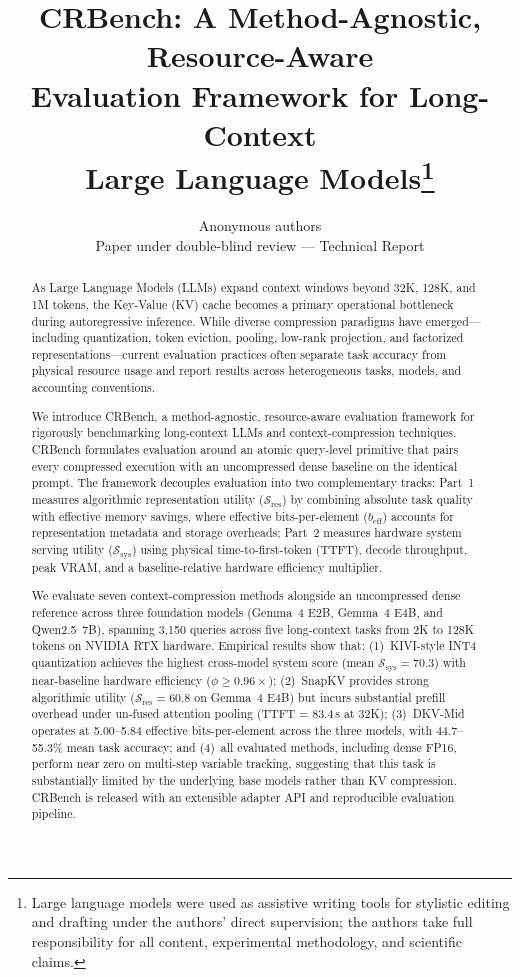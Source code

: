 \documentclass[10pt]{article}
\title{CRBench: A Method-Agnostic, Resource-Aware \\ Evaluation Framework for Long-Context \\ Large Language Models\thanks{Large language models were used as assistive writing tools for stylistic editing and drafting under the authors' direct supervision; the authors take full responsibility for all content, experimental methodology, and scientific claims.}}
\author{\name Anonymous authors \\
        \addr Paper under double-blind review --- Technical Report}
\theoremstyle{definition}
\begin{document}
\maketitle

\begin{abstract}
As Large Language Models (LLMs) expand context windows beyond 32K, 128K, and 1M tokens, the Key-Value (KV) cache becomes a primary operational bottleneck during autoregressive inference. While diverse compression paradigms have emerged---including quantization, token eviction, pooling, low-rank projection, and factorized representations---current evaluation practices often separate task accuracy from physical resource usage and report results across heterogeneous tasks, models, and accounting conventions.

We introduce CRBench, a method-agnostic, resource-aware evaluation framework for rigorously benchmarking long-context LLMs and context-compression techniques. CRBench formulates evaluation around an atomic query-level primitive that pairs every compressed execution with an uncompressed dense baseline on the identical prompt. The framework decouples evaluation into two complementary tracks: Part~1 measures algorithmic representation utility ($\mathcal{S}_{\text{res}}$) by combining absolute task quality with effective memory savings, where effective bits-per-element ($b_{\text{eff}}$) accounts for representation metadata and storage overheads; Part~2 measures hardware system serving utility ($\mathcal{S}_{\text{sys}}$) using physical time-to-first-token (TTFT), decode throughput, peak VRAM, and a baseline-relative hardware efficiency multiplier.

We evaluate seven context-compression methods alongside an uncompressed dense reference across three foundation models (Gemma~4 E2B, Gemma~4 E4B, and Qwen2.5~7B), spanning 3,150 queries across five long-context tasks from 2K to 128K tokens on NVIDIA RTX hardware. Empirical results show that: (1)~KIVI-style INT4 quantization achieves the highest cross-model system score (mean $\mathcal{S}_{\text{sys}} = 70.3$) with near-baseline hardware efficiency ($\phi \ge 0.96\times$); (2)~SnapKV provides strong algorithmic utility ($\mathcal{S}_{\text{res}} = 60.8$ on Gemma~4 E4B) but incurs substantial prefill overhead under un-fused attention pooling (TTFT = 83.4\,s at 32K); (3)~DKV-Mid operates at 5.00--5.84 effective bits-per-element across the three models, with 44.7--55.3\% mean task accuracy; and (4)~all evaluated methods, including dense FP16, perform near zero on multi-step variable tracking, suggesting that this task is substantially limited by the underlying base models rather than KV compression. CRBench is released with an extensible adapter API and reproducible evaluation pipeline.
\end{abstract}
\end{document}

